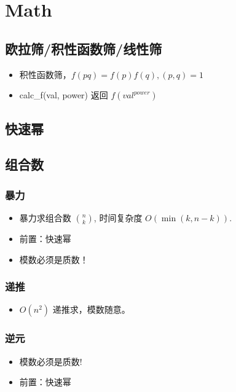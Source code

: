 \section{Math}
\subsection{欧拉筛/积性函数筛/线性筛}
\begin{itemize}
    \item 积性函数筛，$f(pq)=f(p)f(q),(p,q)=1$
    \item calc\_f(val, power) 返回 $f(val^{power})$
\end{itemize}

\subsection{快速幂}


\subsection{组合数}
\subsubsection{暴力}
\begin{itemize}
    \item 暴力求组合数 $\binom{n}{k}$, 时间复杂度 $O(\min(k, n - k))$.
    \item 前置：快速幂
    \item 模数必须是质数！
\end{itemize}

\subsubsection{递推}
\begin{itemize}
    \item $O(n^2)$ 递推求，模数随意。
\end{itemize}

\subsubsection{逆元}
\begin{itemize}
    \item 模数必须是质数!
    \item 前置：快速幂
\end{itemize}

